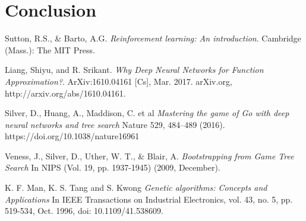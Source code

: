 \documentclass[a4paper,12pt,table]{article}
\begin{document}
    

\section{Conclusion}

\newpage
\begin{thebibliography}{9}
    Sutton, R.S., \& Barto, A.G. 
    \textit{Reinforcement learning: An introduction}. 
    Cambridge (Mass.): The MIT Press.
    
    Liang, Shiyu, and R. Srikant. 
    \textit{Why Deep Neural Networks for Function Approximation?}. 
    ArXiv:1610.04161 [Cs], Mar. 2017. arXiv.org, http://arxiv.org/abs/1610.04161.

    Silver, D., Huang, A., Maddison, C. et al
    \textit{Mastering the game of Go with deep neural networks and tree search}
    Nature 529, 484–489 (2016). https://doi.org/10.1038/nature16961

    Veness, J., Silver, D., Uther, W. T., \& Blair, A.
    \textit{Bootstrapping from Game Tree Search}
    In NIPS (Vol. 19, pp. 1937-1945) (2009, December).

    K. F. Man, K. S. Tang and S. Kwong
    \textit{Genetic algorithms: Concepts and Applications}
    In IEEE Transactions on Industrial Electronics, vol. 43, no. 5, pp. 519-534, Oct. 1996, doi: 10.1109/41.538609.

\end{thebibliography}
\end{document}

